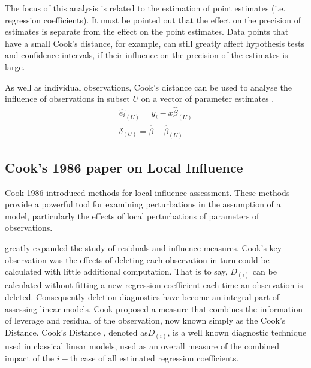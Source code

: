 \documentclass[12pt, a4paper]{report}
\theoremstyle{plain}
\theoremstyle{definition}
\theoremstyle{remark}
\begin{document}
		
		The focus of this analysis is related to the estimation of point estimates (i.e. regression coefficients). It must be pointed out that the effect on the precision of estimates is separate from the effect on the point estimates. Data points that
		have a small Cook's distance, for example, can still greatly affect hypothesis tests and confidence intervals, if their  influence on the precision of the estimates is large.
		
		As well as individual observations, Cook's distance can be used to analyse the influence of observations in subset $U$ on a vector of parameter estimates \citep{cook77}.
		\begin{eqnarray}
		\hat{e_{i}}_{(U)} = y_{i} - x\hat{\beta}_{(U)}\\
		\delta_{(U)} = \hat{\beta} - \hat{\beta}_{(U)}
		\end{eqnarray}
		
		
		\subsection{Cook's 1986 paper on Local Influence}%
		Cook 1986 introduced methods for local influence assessment. These methods provide a powerful tool for examining perturbations in the assumption of a model, particularly the effects of local perturbations of parameters of observations.
		
		
		\citet{cook77} greatly expanded the study of residuals and influence measures.  Cook's key observation was the effects of deleting each observation in turn could be calculated with little additional computation. That is to say, $D_{(i)}$ can be calculated without fitting a new regression coefficient each time an observation is deleted.  Consequently deletion diagnostics have become an integral part of assessing linear models. Cook proposed a measure that combines the information of leverage and residual of the observation, now known simply as the Cook's Distance. Cook's Distance , denoted as$D_{(i)}$, is a well known diagnostic technique used in classical linear models, used as an overall measure of the combined impact of the $i-$th case of all estimated regression coefficients.
		
\end{document}
